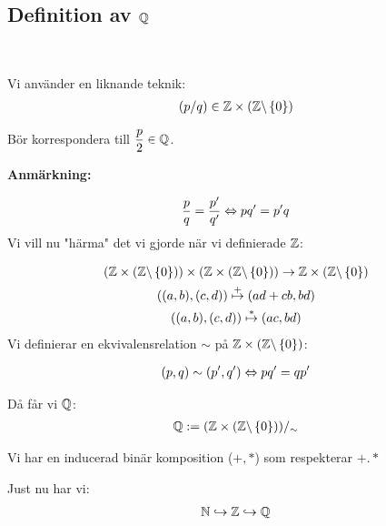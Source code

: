 \subsection{Definition av $\mathbb{Q}$}\hfill\\\par
\noindent Vi använder en liknande teknik:
\begin{equation*}
  \begin{gathered}
    (p/q)\in\mathbb{Z}\times(\mathbb{Z}\backslash\left\{0\right\})
  \end{gathered}
\end{equation*}\par
\noindent Bör korrespondera till $\dfrac{p}{2}\in \mathbb{Q}$.
\par\bigskip
\noindent\textbf{Anmärkning:}\par
\begin{equation*}
  \begin{gathered}
    \dfrac{p}{q} = \dfrac{p^{\prime}}{q^{\prime}}\Leftrightarrow pq^{\prime} = p^{\prime}q\\
  \end{gathered}
\end{equation*}
\noindent Vi vill nu "härma" det vi gjorde när vi definierade $\mathbb{Z}$:\par
\begin{equation*}
  \begin{gathered}
    (\mathbb{Z}\times(\mathbb{Z}\backslash\left\{0\right\}))\times(\mathbb{Z}\times(\mathbb{Z}\backslash\left\{0\right\}))\to\mathbb{Z}\times(\mathbb{Z}\backslash\left\{0\right\})\\
    ((a,b),(c,d))\stackrel{+}{\mapsto}(ad+cb,bd)\\
    ((a,b),(c,d))\stackrel{*}{\mapsto}(ac,bd)
  \end{gathered}
\end{equation*}
\newpage
\noindent Vi definierar en ekvivalensrelation $\sim$ på $\mathbb{Z}\times(\mathbb{Z}\backslash\left\{0\right\})$:\par
\begin{equation*}
  \begin{gathered}
    (p,q)\sim(p^{\prime},q^{\prime})\Leftrightarrow pq^{\prime}=qp^{\prime}
  \end{gathered}
\end{equation*}
\par\bigskip
\noindent Då får vi $\mathbb{Q}$:
\begin{equation*}
  \begin{gathered}
    \mathbb{Q}:=(\mathbb{Z}\times(\mathbb{Z}\backslash\left\{0\right\}))/_\sim
  \end{gathered}
\end{equation*}
\par\bigskip
\noindent Vi har en inducerad binär komposition ($+,*$) som respekterar $+.*$
\par\bigskip
\noindent Just nu har vi:
\begin{equation*}
  \begin{gathered}
    \mathbb{N}\hookrightarrow\mathbb{Z}\hookrightarrow\mathbb{Q}
  \end{gathered}
\end{equation*}
\par\bigskip
